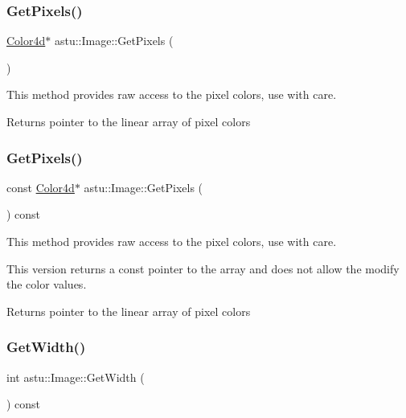 \subsubsection{\texorpdfstring{Get\+Pixels()}{GetPixels()}\hspace{0.1cm}{\footnotesize\ttfamily [1/2]}}
{\footnotesize\ttfamily \hyperlink{classastu_1_1Color}{Color4d}$\ast$ astu\+::\+Image\+::\+Get\+Pixels (\begin{DoxyParamCaption}{ }\end{DoxyParamCaption})}

This method provides raw access to the pixel colors, use with care.

\begin{DoxyReturn}{Returns}
pointer to the linear array of pixel colors 
\end{DoxyReturn}
\mbox{\label{classastu_1_1Image_a6f4f7b5a1ccfac64a7d4d902b428717f}} 
\subsubsection{\texorpdfstring{Get\+Pixels()}{GetPixels()}\hspace{0.1cm}{\footnotesize\ttfamily [2/2]}}
{\footnotesize\ttfamily const \hyperlink{classastu_1_1Color}{Color4d}$\ast$ astu\+::\+Image\+::\+Get\+Pixels (\begin{DoxyParamCaption}{ }\end{DoxyParamCaption}) const}

This method provides raw access to the pixel colors, use with care.

This version returns a const pointer to the array and does not allow the modify the color values.

\begin{DoxyReturn}{Returns}
pointer to the linear array of pixel colors 
\end{DoxyReturn}
\mbox{\label{classastu_1_1Image_a654888b88e109da1099ade3ec54f0520}} 
\subsubsection{\texorpdfstring{Get\+Width()}{GetWidth()}}
{\footnotesize\ttfamily int astu\+::\+Image\+::\+Get\+Width (\begin{DoxyParamCaption}{ }\end{DoxyParamCaption}) const\hspace{0.3cm}{\ttfamily [inline]}}

